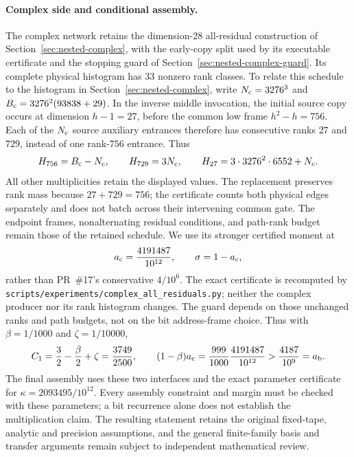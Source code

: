 \paragraph{Complex side and conditional assembly.}
The complex network retains the dimension-28 all-residual construction
of Section~\ref{sec:nested-complex}, with the early-copy split used by
its executable certificate and the stopping guard of
Section~\ref{sec:nested-complex-guard}. Its complete physical histogram
has 33 nonzero rank classes. To relate this schedule to the histogram
in Section~\ref{sec:nested-complex}, write $N_{\rm c}=3276^3$ and
$B_{\rm c}=3276^2(93838+29)$. In the inverse middle invocation, the
initial source copy occurs at dimension $h-1=27$, before the common
low frame $h^2-h=756$. Each of the $N_{\rm c}$ source auxiliary
entrances therefore has consecutive ranks $27$ and $729$, instead
of one rank-$756$ entrance. Thus
\[
 H_{756}=B_{\rm c}-N_{\rm c},\qquad
 H_{729}=3N_{\rm c},\qquad
 H_{27}=3\cdot3276^2\cdot6552+N_{\rm c}.
\]
All other multiplicities retain the displayed values. The replacement
preserves rank mass because $27+729=756$; the certificate counts both
physical edges separately and does not batch across their intervening
common gate. The endpoint frames, nonalternating residual conditions,
and path-rank budget remain those of the retained schedule. We use
its stronger certified moment at
\[
 a_{\rm c}=\frac{4191487}{10^{12}},\qquad \sigma=1-a_{\rm c},
\]
rather than PR~\#17's conservative $4/10^6$. The exact certificate is
recomputed by \texttt{scripts/experiments/complex\_all\_residuals.py};
neither the complex producer nor its rank histogram changes. The guard
depends on those unchanged ranks and path budgets, not on the bit
address-frame choice. Thus with $\beta=1/1000$ and $\zeta=1/10000$,
\[
 C_1=\frac32-\frac\beta2+\zeta=\frac{3749}{2500},\qquad
 (1-\beta)a_{\rm c}
 =\frac{999}{1000}\frac{4191487}{10^{12}}
 >\frac{4187}{10^9}=a_{\rm b}.
\]
The final assembly uses these two interfaces and the exact parameter
certificate for $\kappa=2093495/10^{12}$. Every assembly constraint and
margin must be checked with these parameters; a bit recurrence alone
does not establish the multiplication claim. The resulting statement
retains the original fixed-tape, analytic and precision assumptions,
and the general finite-family basis and transfer arguments remain
subject to independent mathematical review.
